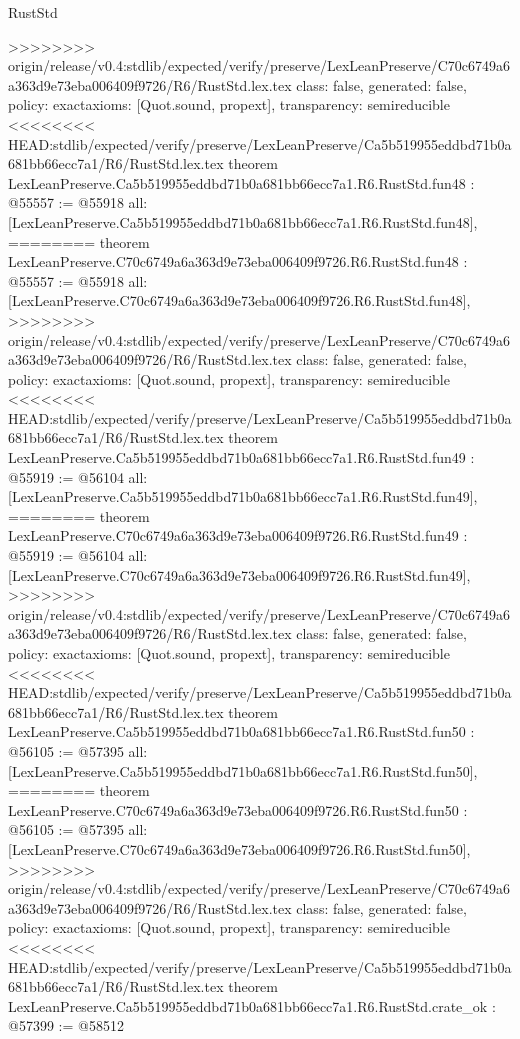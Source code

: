 \begin{lexlean}{RustStd}
\begin{coremodule}
{\begin{coremodule}
{{{{{{{{{{{{{{{{{{{{{{{{{{{{{{{{{{{{{{{{{{{{{{{{{{{>>>>>>>> origin/release/v0.4:stdlib/expected/verify/preserve/LexLeanPreserve/C70c6749a6a363d9e73eba006409f9726/R6/RustStd.lex.tex
  class: false,
  generated: false,
  policy: exact{axioms: [Quot.sound, propext]},
  transparency: semireducible
}
<<<<<<<< HEAD:stdlib/expected/verify/preserve/LexLeanPreserve/Ca5b519955eddbd71b0a681bb66ecc7a1/R6/RustStd.lex.tex
theorem LexLeanPreserve.Ca5b519955eddbd71b0a681bb66ecc7a1.R6.RustStd.fun48 : @55557 := @55918 {
  all: [LexLeanPreserve.Ca5b519955eddbd71b0a681bb66ecc7a1.R6.RustStd.fun48],
========
theorem LexLeanPreserve.C70c6749a6a363d9e73eba006409f9726.R6.RustStd.fun48 : @55557 := @55918 {
  all: [LexLeanPreserve.C70c6749a6a363d9e73eba006409f9726.R6.RustStd.fun48],
>>>>>>>> origin/release/v0.4:stdlib/expected/verify/preserve/LexLeanPreserve/C70c6749a6a363d9e73eba006409f9726/R6/RustStd.lex.tex
  class: false,
  generated: false,
  policy: exact{axioms: [Quot.sound, propext]},
  transparency: semireducible
}
<<<<<<<< HEAD:stdlib/expected/verify/preserve/LexLeanPreserve/Ca5b519955eddbd71b0a681bb66ecc7a1/R6/RustStd.lex.tex
theorem LexLeanPreserve.Ca5b519955eddbd71b0a681bb66ecc7a1.R6.RustStd.fun49 : @55919 := @56104 {
  all: [LexLeanPreserve.Ca5b519955eddbd71b0a681bb66ecc7a1.R6.RustStd.fun49],
========
theorem LexLeanPreserve.C70c6749a6a363d9e73eba006409f9726.R6.RustStd.fun49 : @55919 := @56104 {
  all: [LexLeanPreserve.C70c6749a6a363d9e73eba006409f9726.R6.RustStd.fun49],
>>>>>>>> origin/release/v0.4:stdlib/expected/verify/preserve/LexLeanPreserve/C70c6749a6a363d9e73eba006409f9726/R6/RustStd.lex.tex
  class: false,
  generated: false,
  policy: exact{axioms: [Quot.sound, propext]},
  transparency: semireducible
}
<<<<<<<< HEAD:stdlib/expected/verify/preserve/LexLeanPreserve/Ca5b519955eddbd71b0a681bb66ecc7a1/R6/RustStd.lex.tex
theorem LexLeanPreserve.Ca5b519955eddbd71b0a681bb66ecc7a1.R6.RustStd.fun50 : @56105 := @57395 {
  all: [LexLeanPreserve.Ca5b519955eddbd71b0a681bb66ecc7a1.R6.RustStd.fun50],
========
theorem LexLeanPreserve.C70c6749a6a363d9e73eba006409f9726.R6.RustStd.fun50 : @56105 := @57395 {
  all: [LexLeanPreserve.C70c6749a6a363d9e73eba006409f9726.R6.RustStd.fun50],
>>>>>>>> origin/release/v0.4:stdlib/expected/verify/preserve/LexLeanPreserve/C70c6749a6a363d9e73eba006409f9726/R6/RustStd.lex.tex
  class: false,
  generated: false,
  policy: exact{axioms: [Quot.sound, propext]},
  transparency: semireducible
}
<<<<<<<< HEAD:stdlib/expected/verify/preserve/LexLeanPreserve/Ca5b519955eddbd71b0a681bb66ecc7a1/R6/RustStd.lex.tex
theorem LexLeanPreserve.Ca5b519955eddbd71b0a681bb66ecc7a1.R6.RustStd.crate_ok : @57399 := @58512 {
}}}}}}}}}}}}}}}}}}}}}}}}}}}}}}}}}}}}}}}}}}}}}}}}}}}}}}
\end{coremodule}}
\end{coremodule}
\end{lexlean}
